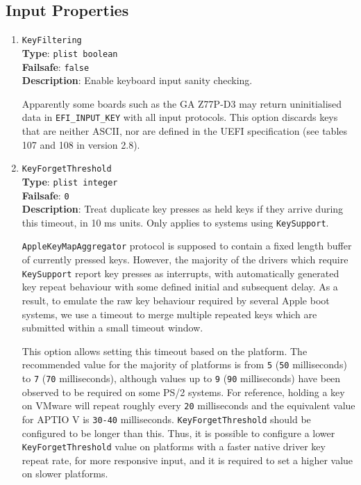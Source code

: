 \documentclass[]{article}
\begin{document}
\subsection{Input Properties}\label{uefiinputprops}

\begin{enumerate}

\item
  \texttt{KeyFiltering}\\
  \textbf{Type}: \texttt{plist\ boolean}\\
  \textbf{Failsafe}: \texttt{false}\\
  \textbf{Description}: Enable keyboard input sanity checking.

  Apparently some boards such as the GA Z77P-D3 may return uninitialised data
  in \texttt{EFI\_INPUT\_KEY} with all input protocols.
  This option discards keys that are neither ASCII, nor are defined
  in the UEFI specification (see tables 107 and 108 in version 2.8).

\item
  \texttt{KeyForgetThreshold}\\
  \textbf{Type}: \texttt{plist\ integer}\\
  \textbf{Failsafe}: \texttt{0}\\
  \textbf{Description}: Treat duplicate key presses as held keys if they arrive
  during this timeout, in 10 ms units. Only applies to systems using \texttt{KeySupport}.

  \texttt{AppleKeyMapAggregator} protocol is supposed to contain a fixed length buffer
  of currently pressed keys. However, the majority of the drivers which require
  \texttt{KeySupport} report key presses as interrupts, with automatically generated
  key repeat behaviour with some defined initial and subsequent delay. As a result,
  to emulate the raw key behaviour required by several Apple boot systems, we use a
  timeout to merge multiple repeated keys which are submitted within a small timeout
  window.

  This option allows setting this timeout based on the platform. The recommended
  value for the majority of platforms is from \texttt{5} (\texttt{50} milliseconds)
  to \texttt{7} (\texttt{70} milliseconds), although values up to \texttt{9}
  (\texttt{90} milliseconds) have been observed to be required on some PS/2 systems.
  For reference, holding a key on VMware will repeat roughly every \texttt{20}
  milliseconds and the equivalent value for APTIO V is \texttt{30-40} milliseconds.
  \texttt{KeyForgetThreshold} should be configured to be longer than this. Thus,
  it is possible to configure a lower \texttt{KeyForgetThreshold} value on platforms
  with a faster native driver key repeat rate, for more responsive input, and it is
  required to set a higher value on slower platforms.


\end{enumerate}
\end{document}
